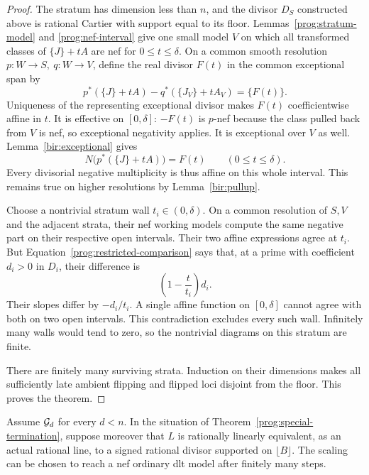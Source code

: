 \begin{proof}
The stratum has dimension less than \(n\), and the divisor \(D_S\)
constructed above is rational Cartier with support equal to its floor.
Lemmas~\ref{prog:stratum-model} and
\ref{prog:nef-interval} give one small model \(V\) on
which all transformed classes of \(\{J\}+tA\) are nef
for \(0\leq t\leq\delta\).  On a common smooth
resolution \(p:W\to S,\ q:W\to V\), define the real divisor \(F(t)\)
in the common exceptional span by
\begin{equation}
 p^*(\{J\}+tA)-q^*(\{J_V\}+tA_V)=\{F(t)\}.
 \label{prog:affine-comparison}
\end{equation}
Uniqueness of the representing exceptional divisor makes \(F(t)\)
coefficientwise affine in \(t\). It is effective on
\([0,\delta]\): \(-F(t)\) is \(p\)-nef because the
class pulled back from \(V\) is nef, so exceptional
negativity applies.  It is exceptional over \(V\) as
well.  Lemma~\ref{bir:exceptional} gives
\[
 N\bigl(p^*(\{J\}+tA)\bigr)=F(t)
 \qquad(0\leq t\leq\delta).
\]
Every divisorial negative multiplicity is thus affine on
this whole interval.  This remains true on higher
resolutions by Lemma~\ref{bir:pullup}.

Choose a nontrivial stratum wall \(t_i\in(0,\delta)\).
On a common resolution of \(S,V\) and the adjacent
strata, their nef working models compute the same
negative part on their respective open intervals.  Their
two affine expressions agree at \(t_i\).  But
Equation~\eqref{prog:restricted-comparison} says that, at a prime
with coefficient \(d_i>0\) in \(D_i\), their difference
is
\[
 \left(1-\frac{t}{t_i}\right)d_i.
\]
Their slopes differ by \(-d_i/t_i\).  A single affine
function on \([0,\delta]\) cannot agree with both on
two open intervals.  This contradiction excludes every
such wall.  Infinitely many walls would tend to zero, so
the nontrivial diagrams on this stratum are finite.

There are finitely many surviving strata.  Induction on
their dimensions makes all sufficiently late ambient
flipping and flipped loci disjoint from the floor.  This
proves the theorem.
\end{proof}

\begin{corollary}
\label{prog:signed-nef}
Assume \(\mathcal G_d\) for every \(d<n\).  In the situation of
Theorem~\ref{prog:special-termination}, suppose moreover
that \(L\) is rationally linearly equivalent, as an actual
rational line, to a signed rational divisor supported on
\(\lfloor B\rfloor\).  The scaling can be chosen to reach
a nef ordinary dlt model after finitely many steps.
\end{corollary}

